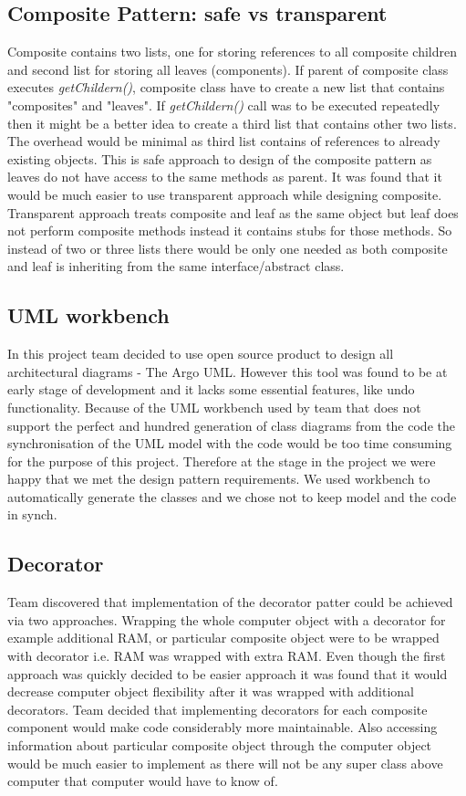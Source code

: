 \documentclass[pdftex,11pt,a4paper]{article}
\begin{document}
\subsection{Composite Pattern: safe vs transparent}
Composite contains two lists, one for storing references to all composite children and second list for storing all leaves (components). If parent of composite class executes \emph{getChildern()}, composite class have to create a new list that contains "composites" and "leaves".
If \emph{getChildern()} call was to be executed repeatedly then it might be a better idea to create a third list that contains other two lists. The overhead would be minimal as third list contains of references to already existing objects.
This is safe approach to design of the composite pattern as leaves do not have access to the same methods as parent. It was found that it would be much easier to use transparent approach while designing composite. Transparent approach treats composite and leaf as the same object but leaf does not perform composite methods instead it contains stubs for those methods. So instead of two or three lists there would be only one needed as both composite and leaf is inheriting from the same interface/abstract class.

\subsection{UML workbench}
In this project team decided to use open source product to design all architectural diagrams - The Argo UML. However this tool was found to be at early stage of development and it lacks some essential features, like undo functionality. Because of the UML workbench used by team that does not support the perfect and hundred generation of class diagrams from the code the synchronisation of the UML model with the code would be too time consuming for the purpose of this project. Therefore at the stage in the project we were happy that we met the design pattern requirements. We used workbench to automatically generate the classes and we chose not to keep model and the code in synch.

\subsection{Decorator}

Team discovered that implementation of the decorator patter could be achieved via two approaches. Wrapping the whole computer object with a decorator for example additional RAM, or particular composite object were to be wrapped with decorator i.e. RAM was wrapped with extra RAM. Even though the first approach was quickly decided to be easier approach it was found that it would decrease computer object flexibility after it was wrapped with additional decorators. Team decided that implementing decorators for each composite component would make code considerably more maintainable. Also accessing information about particular composite object through the computer object would be much easier to implement as there will not be any super class above computer that computer would have to know of.
\end{document}
